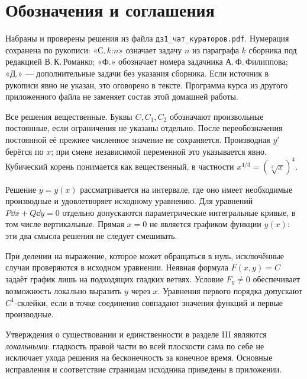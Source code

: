 \section*{Обозначения и соглашения}
Набраны и проверены решения из файла
\texttt{дз1\_чат\_кураторов.pdf}. Нумерация сохранена по рукописи:
«С.\,$k$:$n$» означает задачу $n$ из параграфа $k$ сборника под редакцией
В.\,К.\,Романко; «Ф.» обозначает номера задачника
А.\,Ф.\,Филиппова; «Д.» --- дополнительные задачи без указания сборника.
Если источник в рукописи явно не указан, это оговорено в тексте.
Программа курса из другого приложенного файла не заменяет состав этой домашней работы.

Все решения вещественные. Буквы $C,C_1,C_2$ обозначают произвольные
постоянные, если ограничения не указаны отдельно. После переобозначения
постоянной её прежнее численное значение не сохраняется.
Производная $y'$ берётся по $x$; при смене независимой переменной это
указывается явно. Кубический корень понимается как вещественный,
в частности $x^{4/3}=(\sqrt[3]{x})^4$.

Решение $y=y(x)$ рассматривается на интервале, где оно имеет необходимые
производные и удовлетворяет исходному уравнению. Для уравнений
$P\dd x+Q\dd y=0$ отдельно допускаются параметрические интегральные
кривые, в том числе вертикальные. Прямая $x=0$ не является графиком
функции $y(x)$: эти два смысла решения не следует смешивать.

При делении на выражение, которое может обращаться в нуль, исключённые
случаи проверяются в исходном уравнении. Неявная формула $F(x,y)=C$
задаёт график лишь на подходящих гладких ветвях. Условие $F_y\ne0$
обеспечивает возможность локально выразить $y$ через $x$.
Уравнения первого порядка допускают $C^1$-склейки, если в точке
соединения совпадают значения функций и первые производные.

Утверждения о существовании и единственности в разделе III являются
\emph{локальными}: гладкость правой части во всей плоскости сама по себе
не исключает ухода решения на бесконечность за конечное время.
Основные исправления и соответствие страницам исходника приведены в приложении.
